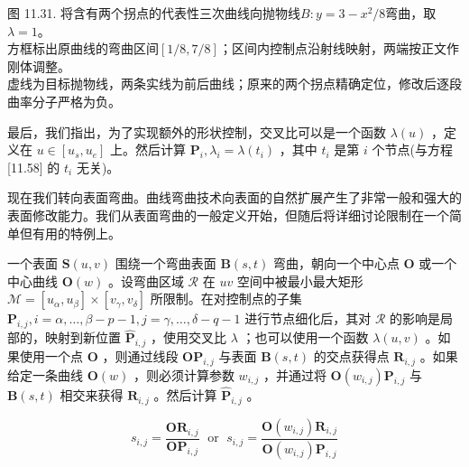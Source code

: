 \documentclass[../main.tex]{subfiles}
\begin{document}
\begin{center}
\begin{minipage}{26cm}
\centering
{}
\par\smallskip
图 11.31. 将含有两个拐点的代表性三次曲线向抛物线$B:y=3-x^2/8$弯曲，取$\lambda=1$。\\
方框标出原曲线的弯曲区间$[1/8,7/8]$；区间内控制点沿射线映射，两端按正文作刚体调整。\\
虚线为目标抛物线，两条实线为前后曲线；原来的两个拐点精确定位，修改后逐段曲率分子严格为负。
\end{minipage}
\end{center}

最后，我们指出，为了实现额外的形状控制，交叉比可以是一个函数 \(\lambda \left( u\right)\) ，定义在 \(u \in  \left\lbrack  {{u}_{s},{u}_{e}}\right\rbrack\) 上。然后计算 \({\mathbf{P}}_{i},{\lambda }_{i} = \lambda \left( {t}_{i}\right)\) ，其中 \({t}_{i}\) 是第 \(i\) 个节点(与方程 [11.58] 的 \({t}_{i}\) 无关)。

现在我们转向表面弯曲。曲线弯曲技术向表面的自然扩展产生了非常一般和强大的表面修改能力。我们从表面弯曲的一般定义开始，但随后将详细讨论限制在一个简单但有用的特例上。

一个表面 \(\mathbf{S}\left( {u,v}\right)\) 围绕一个弯曲表面 \(\mathbf{B}\left( {s,t}\right)\) 弯曲，朝向一个中心点 \(\mathbf{O}\) 或一个中心曲线 \(\mathbf{O}\left( w\right)\) 。设弯曲区域 \(\mathcal{R}\) 在 \({uv}\) 空间中被最小最大矩形 \(\mathcal{M} = \left\lbrack  {{u}_{\alpha },{u}_{\beta }}\right\rbrack   \times  \left\lbrack  {{v}_{\gamma },{v}_{\delta }}\right\rbrack\) 所限制。在对控制点的子集 \({\mathbf{P}}_{i,j},i = \alpha ,\ldots ,\beta  - p - 1,j = \gamma ,\ldots ,\delta  - q - 1\) 进行节点细化后，其对 \(\mathcal{R}\) 的影响是局部的，映射到新位置 \({\widehat{\mathbf{P}}}_{i,j}\) ，使用交叉比 \(\lambda\) ；也可以使用一个函数 \(\lambda \left( {u,v}\right)\) 。如果使用一个点 \(\mathbf{O}\) ，则通过线段 \({\mathbf{{OP}}}_{i,j}\) 与表面 \(\mathbf{B}\left( {s,t}\right)\) 的交点获得点 \({\mathbf{R}}_{i,j}\) 。如果给定一条曲线 \(\mathbf{O}\left( w\right)\) ，则必须计算参数 \({w}_{i,j}\) ，并通过将 \(\mathbf{O}\left( {w}_{i,j}\right) {\mathbf{P}}_{i,j}\) 与 \(\mathbf{B}\left( {s,t}\right)\) 相交来获得 \({\mathbf{R}}_{i,j}\) 。然后计算 \({\widehat{\mathbf{P}}}_{i,j}\) 。

\[
{s}_{i,j} = \frac{{\mathbf{{OR}}}_{i,j}}{{\mathbf{{OP}}}_{i,j}}\;\text{ or }\;{s}_{i,j} = \frac{\mathbf{O}\left( {w}_{i,j}\right) {\mathbf{R}}_{i,j}}{\mathbf{O}\left( {w}_{i,j}\right) {\mathbf{P}}_{i,j}} \tag{11.59}
\]
\end{document}
